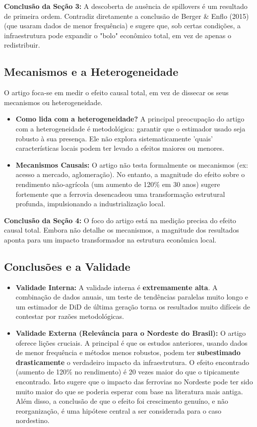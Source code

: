 \documentclass[12pt, a4paper]{article}
\begin{document}
\noindent\textbf{Conclusão da Seção 3:} A descoberta de ausência de spillovers é um resultado de primeira ordem. Contradiz diretamente a conclusão de Berger \& Enflo (2015) (que usaram dados de menor frequência) e sugere que, sob certas condições, a infraestrutura pode expandir o "bolo" econômico total, em vez de apenas o redistribuir.

\subsection{Mecanismos e a Heterogeneidade}
O artigo foca-se em medir o efeito causal total, em vez de dissecar os seus mecanismos ou heterogeneidade.
\begin{itemize}
    \item \textbf{Como lida com a heterogeneidade?} A principal preocupação do artigo com a heterogeneidade é metodológica: garantir que o estimador usado seja robusto à sua presença. Ele não explora sistematicamente 'quais' características locais podem ter levado a efeitos maiores ou menores.
    \item \textbf{Mecanismos Causais:} O artigo não testa formalmente os mecanismos (ex: acesso a mercado, aglomeração). No entanto, a magnitude do efeito sobre o rendimento não-agrícola (um aumento de 120\% em 30 anos) sugere fortemente que a ferrovia desencadeou uma transformação estrutural profunda, impulsionando a industrialização local.
\end{itemize}

\noindent\textbf{Conclusão da Seção 4:} O foco do artigo está na medição precisa do efeito causal total. Embora não detalhe os mecanismos, a magnitude dos resultados aponta para um impacto transformador na estrutura econômica local.

\subsection{Conclusões e a Validade}
\begin{itemize}
    \item \textbf{Validade Interna:} A validade interna é \textbf{extremamente alta}. A combinação de dados anuais, um teste de tendências paralelas muito longo e um estimador de DiD de última geração torna os resultados muito difíceis de contestar por razões metodológicas.
    \item \textbf{Validade Externa (Relevância para o Nordeste do Brasil):} O artigo oferece lições cruciais. A principal é que os estudos anteriores, usando dados de menor frequência e métodos menos robustos, podem ter \textbf{subestimado drasticamente} o verdadeiro impacto da infraestrutura. O efeito encontrado (aumento de 120\% no rendimento) é 20 vezes maior do que o tipicamente encontrado. Isto sugere que o impacto das ferrovias no Nordeste pode ter sido muito maior do que se poderia esperar com base na literatura mais antiga. Além disso, a conclusão de que o efeito foi crescimento genuíno, e não reorganização, é uma hipótese central a ser considerada para o caso nordestino.
\end{itemize}
\end{document}
